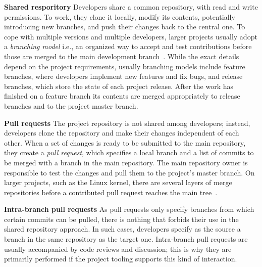 \documentclass{acm_proc_article-sp}
\begin{document}

\textbf{Shared resporitory}
    Developers share a common repository, with read and
    write permissions. To work, they clone it locally, modify its contents,
    potentially introducing new branches, and push their changes back to the
    central one. To cope with multiple versions and multiple developers, larger
    projects usually adopt a {\em branching model} i.e., an organized way to
    accept and test contributions before those are merged to the main
    development branch~\cite{Bird12}. While the exact details depend on the
    project requirements, usually branching models include feature branches,
    where developers implement new features and fix bugs, and release branches,
    which store the state of each project release. After the work has finished
    on a feature branch its contents are merged appropriately to release
    branches and to the project master branch.

\textbf{Pull requests}
    The project repository is not shared among developers;
    instead, developers clone the repository and make their changes independent
    of each other. When a set of changes is ready to be submitted to the main
    repository, they create a \emph{pull request}, which specifies a local
    branch and a list of commits to be merged with a branch in the main
    repository. The main repository owner is responsible to test the changes and
    pull them to the project's master branch. On larger projects, such as the
    Linux kernel, there are several layers of merge repositories before a
    contributed pull request reaches the main tree~\cite{Cornf10}.

\textbf{Intra-branch pull requests}
    As pull requests only specify branches from
    which certain commits can be pulled, there is nothing that forbids their use
    in the shared repository approach. In such cases, developers specify as the
    source a branch in the same repository as the target one.
    Intra-branch pull requests are usually accompanied by code reviews and
    discussion; this is why they are primarily performed if the project tooling
    supports this kind of interaction.

\end{document}

